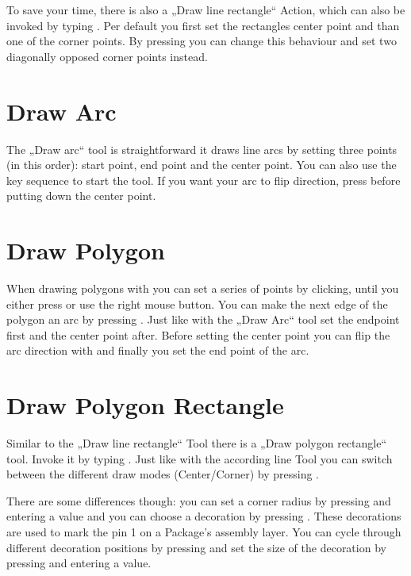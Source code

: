\documentclass[letterpaper,10pt,czech]{sphinxmanual}
\begin{document}
To save your time, there is also a „Draw line rectangle“ Action, which can also be invoked by typing . Per default you first set the rectangles center point and than one of the corner points. By pressing  you can change this behaviour and set two diagonally opposed corner points instead.


\section{Draw Arc}
\label{\detokenize{drawing:draw-arc}}
\noindent{}

The „Draw arc“ tool is straightforward it draws line arcs by setting three points (in this order): start point, end point and the center point. You can also use the key sequence  to start the tool. If you want your arc to flip direction, press  before putting down the center point.


\section{Draw Polygon}
\label{\detokenize{drawing:draw-polygon}}
\noindent{}

When drawing polygons with  you can set a series of points by clicking, until you either press  or use the right mouse button. You can make the next edge of the polygon an arc by pressing . Just like with the „Draw Arc“ tool set the endpoint first and the center point after. Before setting the center point you can flip the arc direction with  and finally you set the end point of the arc.


\section{Draw Polygon Rectangle}
\label{\detokenize{drawing:draw-polygon-rectangle}}


Similar to the „Draw line rectangle“ Tool there is a „Draw polygon rectangle“ tool. Invoke it by typing . Just like with the according line Tool you can switch between the different draw modes (Center/Corner) by pressing .

There are some differences though: you can set a corner radius by pressing  and entering a value and you can choose a decoration by pressing . These decorations are used to mark the pin 1 on a Package’s assembly layer. You can cycle through different decoration positions by pressing  and set the size of the decoration by pressing  and entering a value.
\end{document}
